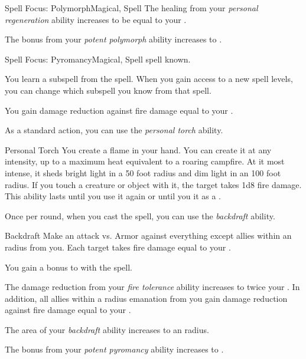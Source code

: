 \begin{feat}{Spell Focus: Polymorph}{Magical, Spell}
         The healing from your \textit{personal regeneration} ability increases to be equal to your .

         The bonus from your \textit{potent polymorph} ability increases to .
    \end{feat}

    \begin{feat}{Spell Focus: Pyromancy}{Magical, Spell}
        \featpre {} spell known.

         You learn a subspell from the  spell.
        When you gain access to a new spell levels, you can change which subspell you know from that spell.

         You gain damage reduction against fire damage equal to your .

         As a standard action, you can use the \textit{personal torch} ability.
        \begin{ability}{Personal Torch}
            You create a flame in your hand.
            You can create it at any intensity, up to a maximum heat equivalent to a roaring campfire.
            At it most intense, it sheds bright light in a 50 foot radius and dim light in an 100 foot radius.
            If you touch a creature or object with it, the target takes 1d8 fire damage.
            This ability lasts until you use it again or until you  it as a .
        \end{ability}

         Once per round, when you cast the  spell, you can use the \textit{backdraft} ability.
        \begin{ability}{Backdraft}
            Make an attack vs. Armor against everything except allies within an \areasmall radius from you.
            \hit Each target takes fire damage equal to your .
        \end{ability}

         You gain a  bonus to  with the  spell.

         The damage reduction from your \textit{fire tolerance} ability increases to twice your .
        In addition, all allies within a \areamed radius emanation from you gain damage reduction against fire damage equal to your .

         The area of your \textit{backdraft} ability increases to an \areamed radius.

         The bonus from your \textit{potent pyromancy} ability increases to .
    \end{feat}

